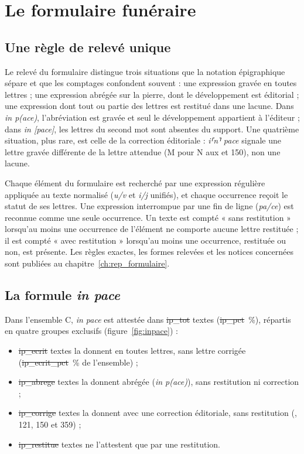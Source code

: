\chapter{Le formulaire funéraire}\label{ch:formulaire}

\section{Une règle de relevé unique}

Le relevé du formulaire distingue trois situations que la notation épigraphique sépare et que les comptages confondent souvent : une expression gravée en toutes lettres ; une expression abrégée sur la pierre, dont le développement est éditorial ; une expression dont tout ou partie des lettres est restitué dans une lacune. Dans \emph{in p(ace)}, l’abréviation est gravée et seul le développement appartient à l’éditeur ; dans \emph{in [pace]}, les lettres du second mot sont absentes du support. Une quatrième situation, plus rare, est celle de la correction éditoriale : \emph{i⸢n⸣ pace} signale une lettre gravée différente de la lettre attendue (M pour N aux  et 150), non une lacune.

Chaque élément du formulaire est recherché par une expression régulière appliquée au texte normalisé (\emph{u/v} et \emph{i/j} unifiés), et chaque occurrence reçoit le statut de ses lettres. Une expression interrompue par une fin de ligne (\emph{pa/ce}) est reconnue comme une seule occurrence. Un texte est compté « sans restitution » lorsqu’au moins une occurrence de l’élément ne comporte aucune lettre restituée ; il est compté « avec restitution » lorsqu’au moins une occurrence, restituée ou non, est présente. Les règles exactes, les formes relevées et les notices concernées sont publiées au chapitre~\ref{ch:rep_formulaire}.

\section{La formule \emph{in pace}}

Dans l’ensemble C, \emph{in pace} est attestée dans \st{ip_tot} textes (\st{ip_pct}~\%), répartis en quatre groupes exclusifs (figure~\ref{fig:inpace}) :

\begin{itemize}
\item \st{ip_ecrit} textes la donnent en toutes lettres, sans lettre corrigée (\st{ip_ecrit_pct}~\% de l’ensemble) ;
\item \st{ip_abrege} textes la donnent abrégée (\emph{in p(ace)}), sans restitution ni correction ;
\item \st{ip_corrige} textes la donnent avec une correction éditoriale, sans restitution (, 121, 150 et 359) ;
\item \st{ip_restitue} textes ne l’attestent que par une restitution.
\end{itemize}

